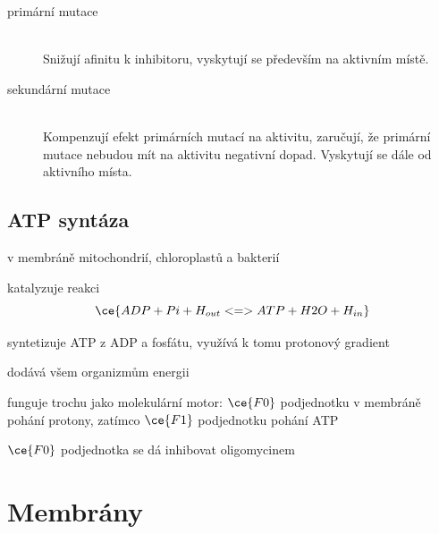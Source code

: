 \documentclass[DIV=8]{scrreprt}
\begin{document}
\begin{description}
\item[primární mutace]\hfill \\
Snižují afinitu k inhibitoru, vyskytují se především na aktivním místě.


\item[sekundární mutace]\hfill \\
Kompenzují efekt primárních mutací na aktivitu, zaručují, že primární mutace nebudou mít na aktivitu negativní dopad. Vyskytují se dále od aktivního místa.

\end{description}


\section{ATP syntáza} \label{ATP syntáza} \FloatBarrier


\begin{myItemize}[nosep]
    \item v membráně mitochondrií, chloroplastů a bakterií
    \item katalyzuje reakci
\[\ce{ADP + Pi + H_{out} <=> ATP + H2O + H_{in}}\]
\begin{myItemize}[nosep]
    \item syntetizuje ATP z ADP a fosfátu, využívá k tomu protonový gradient
\end{myItemize}

    \item dodává všem organizmům energii
    \item funguje trochu jako molekulární motor: \(\ce{F0}\) podjednotku v membráně pohání protony, zatímco \(\ce{F1}\) podjednotku pohání ATP
    \item \(\ce{F0}\) podjednotka se dá inhibovat oligomycinem
\end{myItemize}



\chapter{Membrány} \label{Membrány}
\end{document}
